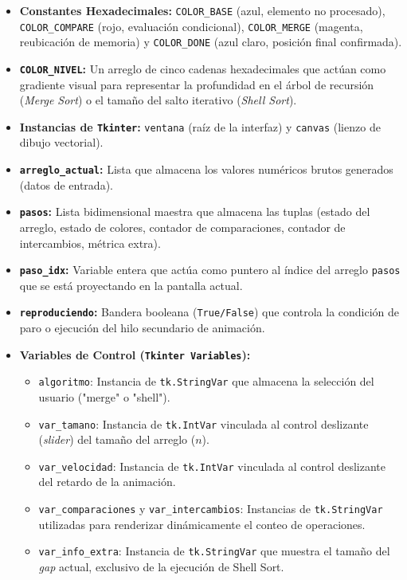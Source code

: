 \documentclass[conference]{IEEEtran}
\begin{document}
\begin{itemize}
    \item \textbf{Constantes Hexadecimales:} 
    \texttt{COLOR\_BASE} (azul, elemento no procesado), \texttt{COLOR\_COMPARE} (rojo, evaluación condicional), \texttt{COLOR\_MERGE} (magenta, reubicación de memoria) y \texttt{COLOR\_DONE} (azul claro, posición final confirmada).
    \item \textbf{\texttt{COLOR\_NIVEL}:} Un arreglo de cinco cadenas hexadecimales que actúan como gradiente visual para representar la profundidad en el árbol de recursión (\textit{Merge Sort}) o el tamaño del salto iterativo (\textit{Shell Sort}).
    \item \textbf{Instancias de \texttt{Tkinter}:} \texttt{ventana} (raíz de la interfaz) y \texttt{canvas} (lienzo de dibujo vectorial).
    \item \textbf{\texttt{arreglo\_actual}:} Lista que almacena los valores numéricos brutos generados (datos de entrada).
    \item \textbf{\texttt{pasos}:} Lista bidimensional maestra que almacena las tuplas (estado del arreglo, estado de colores, contador de comparaciones, contador de intercambios, métrica extra).
    \item \textbf{\texttt{paso\_idx}:} Variable entera que actúa como puntero al índice del arreglo \texttt{pasos} que se está proyectando en la pantalla actual.
    \item \textbf{\texttt{reproduciendo}:} Bandera booleana (\texttt{True/False}) que controla la condición de paro o ejecución del hilo secundario de animación.
    \item \textbf{Variables de Control (\texttt{Tkinter Variables}):}
    \begin{itemize}
        \item \texttt{algoritmo}: Instancia de \texttt{tk.StringVar} que almacena la selección del usuario ("merge" o "shell").
        \item \texttt{var\_tamano}: Instancia de \texttt{tk.IntVar} vinculada al control deslizante (\textit{slider}) del tamaño del arreglo ($n$).
        \item \texttt{var\_velocidad}: Instancia de \texttt{tk.IntVar} vinculada al control deslizante del retardo de la animación.
        \item \texttt{var\_comparaciones} y \texttt{var\_intercambios}: Instancias de \texttt{tk.StringVar} utilizadas para renderizar dinámicamente el conteo de operaciones.
        \item \texttt{var\_info\_extra}: Instancia de \texttt{tk.StringVar} que muestra el tamaño del \textit{gap} actual, exclusivo de la ejecución de Shell Sort.
    \end{itemize}
\end{itemize}
\end{document}
